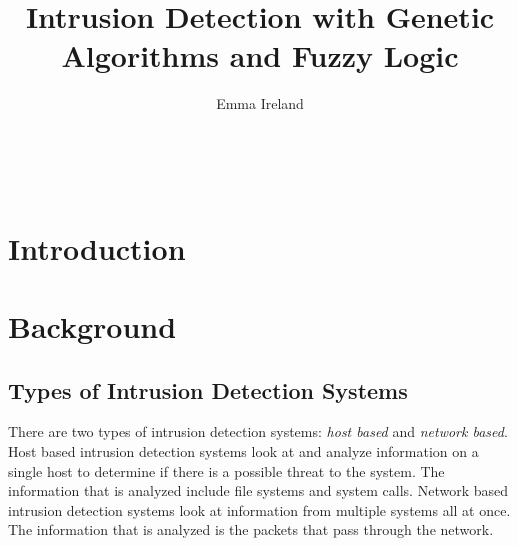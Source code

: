 \documentclass{sig-alternate}
\begin{document}

\title{Intrusion Detection with Genetic Algorithms and Fuzzy Logic}


\author{
\alignauthor
Emma Ireland\\
	\\
	\\
	\\
}

\maketitle
\begin{abstract}

\end{abstract}


\terms{}


\section{Introduction}





\section{Background}

\subsection{Types of Intrusion Detection Systems}
There are two types of intrusion detection systems: \emph{host based} and \emph{network based}. Host based intrusion detection systems look at and analyze information on a single host to determine if there is a possible threat to the system. The information that is analyzed include file systems and system calls. Network based intrusion detection systems look at information from multiple systems all at once. The information that is analyzed is the packets that pass through the network.~\cite{DBLP:journals/corr/abs-1204-6416}
\end{document}
